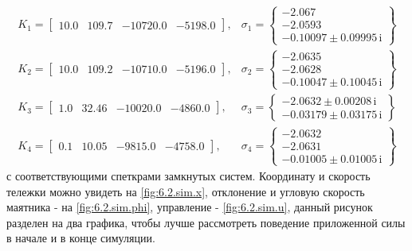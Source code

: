 \begin{equation*}
\renewcommand{\arraystretch}{1.2}
\begin{array}{ll}
K_1 = \begin{bmatrix} 10.0 & 109.7 & -10720.0 & -5198.0 \end{bmatrix}, &
\sigma_1 = \begin{Bmatrix}
-2.067\\
-2.0593\\
-0.10097 \pm 0.09995\,\mathrm{i}
\end{Bmatrix} \\[3ex]
K_2 = \begin{bmatrix} 10.0 & 109.2 & -10710.0 & -5196.0 \end{bmatrix}, &
\sigma_2 = \begin{Bmatrix}
-2.0635\\
-2.0628\\
-0.10047 \pm 0.10045\,\mathrm{i}
\end{Bmatrix} \\[3ex]
K_3 = \begin{bmatrix} 1.0 & 32.46 & -10020.0 & -4860.0 \end{bmatrix}, &
\sigma_3 = \begin{Bmatrix}
-2.0632 \pm 0.00208\,\mathrm{i}\\
-0.03179 \pm 0.03175\,\mathrm{i}
\end{Bmatrix} \\[3ex]
K_4 = \begin{bmatrix} 0.1 & 10.05 & -9815.0 & -4758.0 \end{bmatrix}, &
\sigma_4 = \begin{Bmatrix}
-2.0632\\
-2.0631\\
-0.01005 \pm 0.01005\,\mathrm{i}
\end{Bmatrix}
\end{array}
\end{equation*}
с соответствующими спеткрами замкнутых систем.
Координату и скорость тележки можно увидеть на \autoref{fig:6.2.sim.x},
отклонение и угловую скорость маятника - на \autoref{fig:6.2.sim.phi},
управление - \autoref{fig:6.2.sim.u}, данный рисунок разделен на два
графика, чтобы лучше рассмотреть поведение приложенной силы в начале и в 
конце симуляции.

